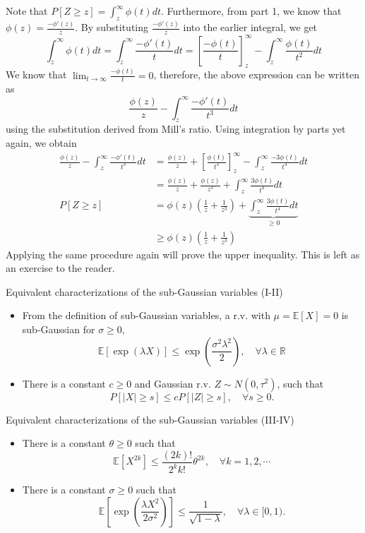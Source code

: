 \documentclass[10pt,handout,english]{beamer}
\newcommand{\E}{\mathbb{E}}
\newcommand{\R}{\mathbb{R}}
\newcommand{\1}{\mathbbm{1}}
\begin{document}
\begin{frame}[allowframebreaks]
Note that $P[Z\geq z]=\int_{z}^{\infty}\phi(t)dt$. Furthermore, from part 1, we know that $\phi(z)=\frac{-\phi'(z)}{z}$. By substituting $\frac{-\phi'(z)}{z}$ into the earlier integral, we get
\[
\int_{z}^{\infty}\phi(t)dt=\int_{z}^{\infty}\frac{-\phi'(t)}{t}dt=\left[\frac{-\phi(t)}{t}\right]_{z}^{\infty}-\int_{z}^{\infty} \frac{\phi(t)}{t^2}dt
\]
We know that $\lim_{t\to \infty}\frac{-\phi(t)}{t}=0$, therefore, the above expression can be written as
\[
\frac{\phi(z)}{z}-\int_{z}^{\infty} \frac{-\phi'(t)}{t^3}dt
\] 
using the substitution derived from Mill's ratio. Using integration by parts yet again, we obtain
\begin{align*}
\frac{\phi(z)}{z}-\int_{z}^{\infty} \frac{-\phi'(t)}{t^3}dt&=\frac{\phi(z)}{z}+\left[\frac{\phi(t)}{t^3}\right]_{z}^{\infty}-\int_{z}^{\infty}\frac{-3\phi(t)}{t^4}dt\\
&=\frac{\phi(z)}{z}+\frac{\phi(z)}{z^3}+\int_{z}^{\infty}\frac{3\phi(t)}{t^4}dt\\
P[Z\geq z]&=\phi(z)\left(\frac{1}{z}+\frac{1}{z^3}\right)+\underbrace{\int_{z}^{\infty}\frac{3\phi(t)}{t^4}dt}_{\geq0}\\
		&\geq \phi(z)\left(\frac{1}{z}+\frac{1}{z^3}\right)
\end{align*}
Applying the same procedure again will prove the upper inequality. This is left as an exercise to the reader.
\end{frame}
\begin{frame}[allowframebreaks]
\begin{block}{Equivalent characterizations of the sub-Gaussian variables (I-II)}
\begin{itemize}
\item[(I)] From the definition of sub-Gaussian variables, a r.v. with $\mu=\E[X]=0$ is sub-Gaussian for $\sigma\geq 0$,
\[
\E[\exp(\lambda X)]\leq\exp\left(\frac{\sigma^2\lambda^2}{2}\right),\quad\forall\lambda\in\R
\]
\item[(II)] There is a constant $c\geq 0$ and Gaussian r.v. $Z\sim N(0,\tau^2)$, such that
\[
P[\lvert X\rvert\geq s]\leq cP[\lvert Z\rvert\geq s],\quad\forall s\geq0.
\]
\end{itemize}
\end{block}
\begin{block}{Equivalent characterizations of the sub-Gaussian variables (III-IV)}
\begin{itemize}
\item[(III)] There is a constant $\theta\geq 0$ such that
\[
\E\left[X^{2k}\right]\leq\frac{(2k)!}{2^kk!}\theta^{2k},\quad \forall k=1,2,\cdots
\] 
\item[(IV)] There is a constant $\sigma\geq 0$ such that
\[
\E\left[\exp\left(\frac{\lambda X^2}{2\sigma^2}\right)\right]\leq\frac{1}{\sqrt{1-\lambda}},\quad\forall\lambda\in[0,1).
\]
\end{itemize}
\end{block}
\end{frame}
\end{document}
